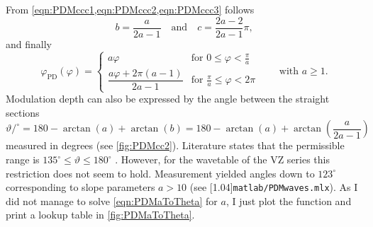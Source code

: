 \documentclass[a4paper]{article}
\newcommand{\TT}[1]{\protect\scalebox{0.75}[1.04]{\texttt{#1}}}
\begin{document}
From \cref{eqn:PDMccc1,eqn:PDMccc2,eqn:PDMccc3} follows
\begin{equation}
  b = \frac{a}{2a-1}
  \quad\text{and}\quad
  c = \frac{2a-2}{2a-1}\pi,
\end{equation}
and finally
\begin{equation}
  \varphi_{\text{PD}}(\varphi)
  = \begin{cases}
      a\varphi
      & \text{for }0\leq\varphi < \frac{\pi}{a}
    \\[6pt]
      \dfrac{a\varphi+2\pi(a-1)}{2a-1}
      & \text{for }\frac{\pi}{a}\leq\varphi < 2\pi 
    \end{cases}
  \qquad\text{with }a\geq 1.
\end{equation}
Modulation depth can also be expressed by the angle between the straight
sections
\begin{equation}
  \label{eqn:PDMaToTheta}
  \vartheta/^{\circ} 
  = 180-\arctan(a)+\arctan(b)
  = 180-\arctan(a)+\arctan\!\left(\frac{a}{2a-1}\right)
\end{equation}
measured in degrees (see \cref{fig:PDMcc2}). Literature states that the
permissible range is $135^\circ\leq\vartheta\leq 180^\circ$ \cite{Ger09}.
However, for the wavetable of the VZ series this restriction does not seem to
hold. Measurement yielded angles down to $123^\circ$ corresponding to slope
parameters $a>10$ (see \TT{matlab/PDMwaves.mlx}). As I did not manage to solve
\cref{eqn:PDMaToTheta} for $a$, I just plot the function and print a lookup
table in \cref{fig:PDMaToTheta}.
%
\end{document}
